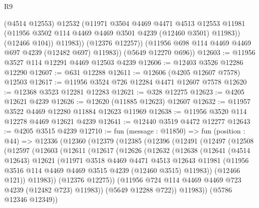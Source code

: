 \begin{lexlean}{R9}
\begin{coremodule}
                (@4514 @12553)
                @12532
                (@11971
                  @3504
                  @4469
                  @4471
                  @4513
                  @12553
                  @11981
                  (@11956 @3502 @114 @4469 @4469 @3501 @4239 (@12460 @3501) @11983))
                (@12466 @104))
              @11983))
          (@12376 @12257))
        (@11956 @698 @114 @4469 @4469 @697 @4239 (@12482 @697) @11983))
      (@5649 @12270 @696))
@12603 := @11956 @3527 @114 @12291 @4469 @12503 @4239
@12606 := @12403 @3526 @12286 @12290
@12607 := @631 @12288
@12611 := @12606 (@4205 @12607 @7578) @12503
@12617 := @11956 @3524 @726 @12284 @4471 @12607 @7578
@12620 := @12368 @3523 @12281 @12283
@12621 := @328 @12275
@12623 := @4205 @12621 @4239
@12626 := @12620 (@11885 @12623) @12607
@12632 := @11957 @3522 @4469 @12280 @11884 @12623 @11969
@12638 := @11956 @3520 @114 @12278 @4469 @12621 @4239
@12641 := @12440 @3519 @4472 @12277
@12643 := @4205 @3515 @4239
@12710 := fun (message : @11850) =>
  fun (position : @44) =>
  @12336
    (@12360
      (@12379
        (@12385
          (@12396
            (@12491
              (@12497
                (@12508
                  (@12597
                    (@12603
                      (@12611
                        (@12617
                          (@12626
                            (@12632
                              (@12638
                                (@12641
                                  (@4514 @12643)
                                  @12621
                                  (@11971
                                    @3518
                                    @4469
                                    @4471
                                    @4513
                                    @12643
                                    @11981
                                    (@11956
                                      @3516
                                      @114
                                      @4469
                                      @4469
                                      @3515
                                      @4239
                                      (@12460 @3515)
                                      @11983))
                                  (@12466 @121))
                                @11983))
                            (@12376 @12275))
                          (@11956 @724 @114 @4469 @4469 @723 @4239 (@12482 @723) @11983))
                        (@5649 @12288 @722))
                      @11983))
                  (@5786 @12346 @12349))

\end{coremodule}
\end{lexlean}
